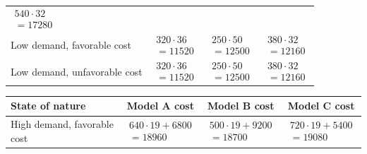 \begin{ExamProblems}
\begin{center}
\begin{tabular}{l c c c}
				$\begin{array}{l}
					540\cdot 32\\
					= 17280
				\end{array}$ \\
				Low demand, favorable cost &
				$\begin{array}{l}
					320\cdot 36\\
					= 11520
				\end{array}$ &
				$\begin{array}{l}
					250\cdot 50\\
					= 12500
				\end{array}$ &
				$\begin{array}{l}
					380\cdot 32\\
					= 12160
				\end{array}$ \\
				Low demand, unfavorable cost &
				$\begin{array}{l}
					320\cdot 36\\
					= 11520
				\end{array}$ &
				$\begin{array}{l}
					250\cdot 50\\
					= 12500
				\end{array}$ &
				$\begin{array}{l}
					380\cdot 32\\
					= 12160
				\end{array}$ \\
				\bottomrule
			\end{tabular}
		\end{center}
		\begin{center}
			\begin{tabular}{l c c c}
				\toprule
				State of nature & Model A cost & Model B cost & Model C cost \\
				\midrule
				High demand, favorable cost &
				$\begin{array}{l}
					640\cdot 19 + 6800\\
					= 18960
				\end{array}$ &
				$\begin{array}{l}
					500\cdot 19 + 9200\\
					= 18700
				\end{array}$ &
				$\begin{array}{l}
					720\cdot 19 + 5400\\
					= 19080
				\end{array}$ \\

\end{tabular}
\end{center}
\end{ExamProblems}
